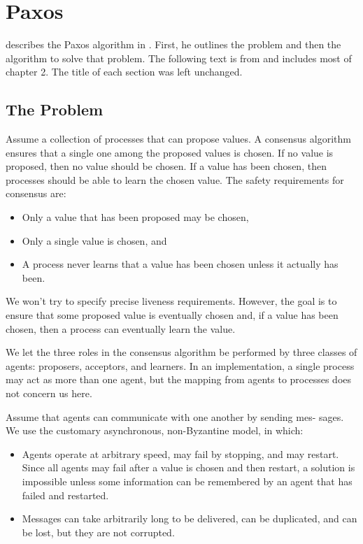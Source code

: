 \section{Paxos}
\citeauthor{Lamport01} describes the Paxos algorithm in \cite{Lamport01}.
First, he outlines the problem and then the algorithm to solve that problem.
The following text is from \cite{Lamport01} and includes most of chapter 2.
The title of each section was left unchanged.

\subsection{The Problem}
Assume a collection of processes that can propose values.
A consensus algorithm ensures that a single one among the proposed values is chosen.
If no value is proposed, then no value should be chosen.
If a value has been chosen, then processes should be able to learn the chosen value.
The safety requirements for consensus are:

\begin{itemize}
    \item Only a value that has been proposed may be chosen,
    \item Only a single value is chosen, and
    \item A process never learns that a value has been chosen unless it actually has been.
\end{itemize}

We won't try to specify precise liveness requirements.
However, the goal is to ensure that some proposed value is eventually chosen and, if a value has been chosen, then a process can eventually learn the value.

We let the three roles in the consensus algorithm be performed by three
classes of agents: proposers, acceptors, and learners.
In an implementation, a single process may act as more than one agent, but the mapping from agents to processes does not concern us here.

Assume that agents can communicate with one another by sending mes-
sages.
We use the customary asynchronous, non-Byzantine model, in which:

\begin{itemize}
    \item Agents operate at arbitrary speed, may fail by stopping, and may restart.
    Since all agents may fail after a value is chosen and then restart, a solution is impossible unless some information can be remembered by an agent that has failed and restarted.
    \item Messages can take arbitrarily long to be delivered, can be duplicated, and can be lost, but they are not corrupted.
\end{itemize}

